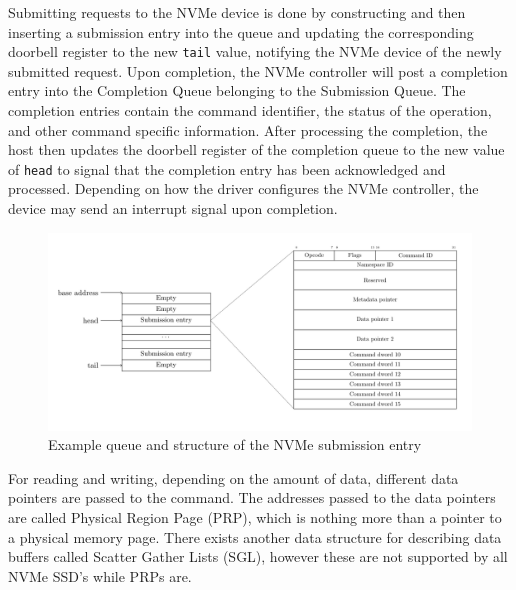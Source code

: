 Submitting requests to the NVMe device is done by constructing and then inserting a submission entry into the queue and updating the corresponding doorbell register to the new \texttt{tail} value, notifying the NVMe device of the newly submitted request. Upon completion, the NVMe controller will post a completion entry into the Completion Queue belonging to the Submission Queue. The completion entries contain the command identifier, the status of the operation, and other command specific information. After processing the completion, the host then updates the doorbell register of the completion queue to the new value of \texttt{head} to signal that the completion entry has been acknowledged and processed. Depending on how the driver configures the NVMe controller, the device may send an interrupt signal upon completion.

\begin{figure}
  \centering
    \includegraphics[width=\textwidth]{figures/nvme-queue}
    \caption{Example queue and structure of the NVMe submission entry}
    \label{fig:nvme-queue}
\end{figure}


For reading and writing, depending on the amount of data, different data pointers are passed to the command. The addresses passed to the data pointers are called Physical Region Page (PRP), which is nothing more than a pointer to a physical memory page. There exists another data structure for describing data buffers called Scatter Gather Lists (SGL), however these are not supported by all NVMe SSD's while PRPs are.

